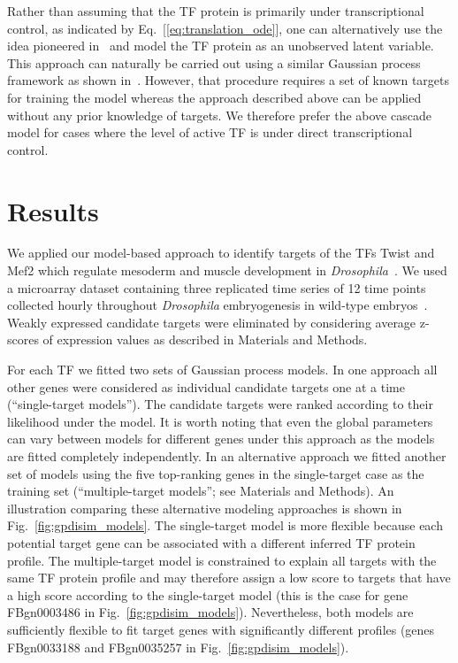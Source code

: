 \documentclass{pnastwo}
\begin{document}
\begin{article}
Rather than assuming that the TF protein is primarily under
transcriptional control, as indicated by
Eq.~[\ref{eq:translation_ode}], one can alternatively use the idea pioneered
in~\cite{Barenco2006a} and model the TF protein as an unobserved
latent variable. This approach can naturally be carried out using a
similar Gaussian process framework as shown in~\cite{Gao2008}. However, that procedure requires a set of known
targets for training the model whereas the approach described above
can be applied without any prior knowledge of targets. We therefore
prefer the above cascade model for cases where the level of active TF is under direct transcriptional control. 

\section{Results}

We applied our model-based approach to identify targets of the TFs
Twist and Mef2 which regulate mesoderm and muscle development in
\emph{Drosophila}~\cite{Sandmann2007,Zinzen2009}. We used a microarray dataset
containing three replicated time series of 12 time points collected
hourly throughout \emph{Drosophila} embryogenesis in wild-type
embryos~\cite{Tomancak2002}.  Weakly expressed candidate targets were eliminated by 
considering average z-scores of expression values as described in
Materials and Methods.

For each TF we fitted two sets of Gaussian process models. In one
approach all other genes were considered as individual candidate targets one at a
time (``single-target models'').  The candidate targets were ranked
according to their likelihood under the model.  It is worth noting that even the global
parameters can vary between models for different genes under this approach as the models
are fitted completely independently. In an alternative approach we fitted another set of models using the five
top-ranking genes in the single-target case as the training set (``multiple-target models''; see
Materials and Methods).  An illustration comparing these alternative
modeling approaches is shown in Fig.~\ref{fig:gpdisim_models}. The
single-target model is more flexible because each
potential target gene can be associated with a different inferred TF
protein profile. The multiple-target model is constrained to explain
all targets with the same TF protein profile and may therefore assign
a low score to targets that have a high score according to the
single-target model (this is the case for gene FBgn0003486 in
Fig.~\ref{fig:gpdisim_models}). Nevertheless, both models are
sufficiently flexible to fit target genes with significantly different
profiles (genes FBgn0033188 and FBgn0035257 in
Fig.~\ref{fig:gpdisim_models}).


\end{article}
\end{document}
